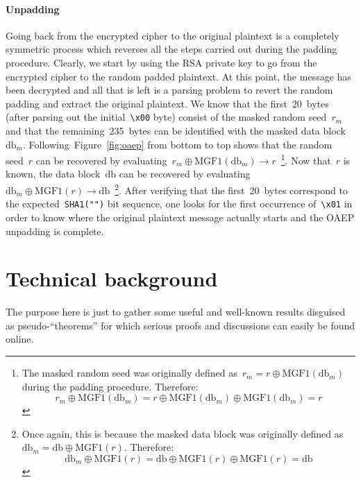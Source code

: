 \documentclass{article}
\begin{document}
\paragraph{Unpadding} Going back from the encrypted cipher to the original plaintext is a completely symmetric process which reverses all the steps carried out during the padding procedure.  Clearly, we start by using the RSA private key to go from the encrypted cipher to the random padded plaintext.  At this point, the message has been decrypted and all that is left is a parsing problem to revert the random padding and extract the original plaintext.  We know that the first~20~bytes (after parsing out the initial~\verb$\x00$ byte) consist of the masked random seed~$r_m$ and that the remaining~235~bytes can be identified with the masked data block~$\text{db}_m$.  Following~Figure~\ref{fig:oaep} from bottom to top shows that the random seed~$r$ can be recovered by evaluating~$r_m \oplus \text{MGF1} ( \text{db}_m) \rightarrow r$~\footnote{The masked random seed was originally defined as~$r_m = r \oplus \text{MGF1}(\text{db}_m)$ during the padding procedure. Therefore:
\begin{equation*}
r_m \oplus \text{MGF1} ( \text{db}_m)  =  r \oplus \text{MGF1}(\text{db}_m) \oplus \text{MGF1}(\text{db}_m) = r    
\end{equation*}
}.  Now that~$r$ is known, the data block~$\text{db}$ can be recovered by evaluating~$\text{db}_m \oplus \text{MGF1}(r) \rightarrow \text{db}$~\footnote{Once again, this is because the masked data block was originally defined as~$\text{db}_m = \text{db} \oplus \text{MGF1}(r)$.  Therefore:
\begin{equation*}
\text{db}_m \oplus \text{MGF1}(r) =  \text{db} \oplus \text{MGF1}(r) \oplus \text{MGF1}(r) = \text{db}
\end{equation*}
}.  After verifying that the first~20~bytes correspond to the expected~\verb$SHA1("")$ bit sequence, one looks for the first occurrence of~\verb$\x01$ in order to know where the original plaintext message actually starts and the OAEP unpadding is complete. 

\section{Technical background}

\noindent The purpose here is just to gather some useful and well-known results disguised as pseudo-``theorems'' for which serious proofs and discussions can easily be found online.
\end{document}
